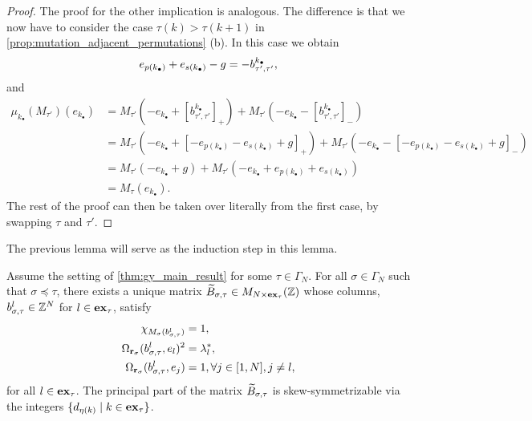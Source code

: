 \begin{proof}
	The proof for the other implication is analogous. The difference is that we now have to
	consider the case $\tau(k) > \tau(k+1)$ in \cref{prop:mutation_adjacent_permutations}
	(b). In this case we obtain
	\begin{equation*}
		e_{p(k_\bullet)} + e_{s(k_\bullet)} - g = - b^{k_\bullet}_{\tau', \tau'},
	\end{equation*}
	and
	\begin{align*}
		\mu_{k_\bullet}(M_{\tau'})(e_{k_\bullet})
		 & = M_{\tau'}(-e_{k_\bullet} + [b^{k_\bullet}_{\tau', \tau'}]_{+}) + M_{\tau'}(-e_{k_\bullet} - [b^{k_\bullet}_{\tau', \tau'}]_{-})                         \\
		 & = M_{\tau'}(-e_{k_\bullet} + [-e_{p(k_\bullet)} - e_{s(k_\bullet)} + g]_{+}) + M_{\tau'}(-e_{k_\bullet} - [-e_{p(k_\bullet)} - e_{s(k_\bullet)} + g]_{-}) \\
		 & = M_{\tau'}(-e_{k_\bullet} + g) + M_{\tau'}(-e_{k_\bullet} + e_{p(k_\bullet)} + e_{s(k_\bullet)})                                                         \\
		 & = M_{\tau}(e_{k_\bullet}).
	\end{align*}
	The rest of the proof can then be taken over literally from the first case, by swapping
	$\tau$ and $\tau'$.

\end{proof}
The previous lemma will serve as the induction step in this lemma.
\begin{lemma}\label{lem:inductive_columns}
	Assume the setting of \cref{thm:gy_main_result} for some $\tau \in \Gamma_N$. For all $\sigma \in \Gamma_N$ such that $\sigma \preceq \tau$, there exists a unique matrix $\widetilde{B}_{\sigma, \tau}\in M_{N \times \mathbf{ex}_\tau} (\mathbb{Z})$ whose columns, $b^l_{\sigma, \tau} \in \mathbb{Z}^N$ for $l\in \mathbf{ex}_\tau$, satisfy
	\begin{equation}\label{eq:conditions_for_blsigmatau}
		\begin{aligned}
			\chi_{M_\sigma(b^l_{\sigma, \tau})}            & = 1,                                \\
			\Omega_{\mathbf{r}_\sigma}(b^l_{\sigma,\tau}, e_l)^2 & = \lambda^*_l,                      \\
			\Omega_{\mathbf{r}_\sigma}(b^l_{\sigma,\tau}, e_j)   & = 1, \forall j \in [1, N], j\neq l,
		\end{aligned}
	\end{equation}
	for all $l \in \mathbf{ex}_\tau$. The principal part of the matrix $\widetilde{B}_{\sigma, \tau}$ is
	skew-symmetrizable via the integers $\{d_{\eta(k)} \mid k \in \mathbf{ex}_\tau\}$.
\end{lemma}

